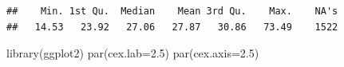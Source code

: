 \documentclass[
  11pt,
]{article}
\newenvironment{Shaded}{\begin{snugshade}}{\end{snugshade}}
\newcommand{\AttributeTok}[1]{\textcolor[rgb]{0.77,0.63,0.00}{#1}}
\newcommand{\FloatTok}[1]{\textcolor[rgb]{0.00,0.00,0.81}{#1}}
\newcommand{\FunctionTok}[1]{\textcolor[rgb]{0.00,0.00,0.00}{#1}}
\newcommand{\NormalTok}[1]{#1}
\newcommand{\SpecialCharTok}[1]{\textcolor[rgb]{0.00,0.00,0.00}{#1}}
\begin{document}
\begin{Shaded}
\end{Shaded}

\begin{verbatim}
##    Min. 1st Qu.  Median    Mean 3rd Qu.    Max.    NA's 
##   14.53   23.92   27.06   27.87   30.86   73.49    1522
\end{verbatim}

\begin{Shaded}
\begin{Highlighting}[]
\FunctionTok{library}\NormalTok{(ggplot2)}
\FunctionTok{par}\NormalTok{(}\AttributeTok{cex.lab=}\FloatTok{2.5}\NormalTok{)}
\FunctionTok{par}\NormalTok{(}\AttributeTok{cex.axis=}\FloatTok{2.5}\NormalTok{) }


\end{Highlighting}
\end{Shaded}
\end{document}

